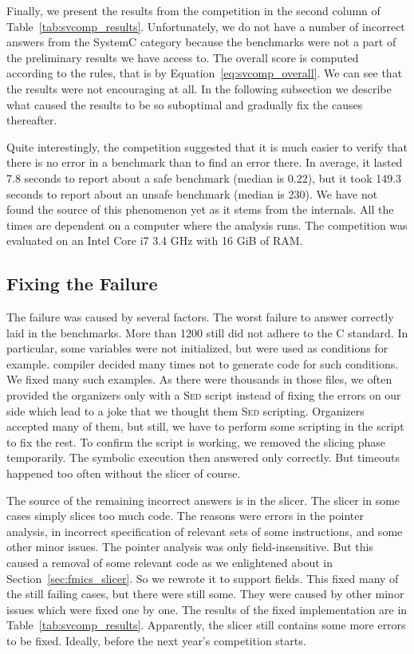 Finally, we present the results from the competition in the second column of
Table~\ref{tab:svcomp_results}. Unfortunately, we do not have a number of
incorrect answers from the SystemC category because the benchmarks were not a
part of the preliminary results we have access to. The overall score is
computed according to the rules, that is by Equation~\ref{eq:svcomp_overall}.
We can see that the \symbio results were not encouraging at all. In the
following subsection we describe what caused the results to be so suboptimal
and gradually fix the causes thereafter.

Quite interestingly, the competition suggested that it is much easier to
verify that there is no error in a benchmark than to find an error there. In
average, it lasted 7.8 seconds to report  about a safe benchmark
(median is 0.22), but it took 149.3 seconds to report  about an
unsafe benchmark (median is 230). We have not found the source of this
phenomenon yet as it stems from the \klee internals. All the times are
dependent on a computer where the analysis runs. The competition was evaluated
on an Intel Core i7 3.4 GHz with 16 GiB of RAM.

\subsection*{Fixing the Failure}
The failure was caused by several factors. The worst failure to answer
correctly laid in the benchmarks. More than 1200 still did not adhere to the C
standard. In particular, some variables were not initialized, but were used as
conditions for example. \clang compiler decided many times not to generate
code for such conditions.  We fixed many such examples. As there were
thousands in those files, we often provided the organizers only with a
\textsc{Sed} script instead of fixing the errors on our side which lead to a
joke that we thought them \textsc{Sed} scripting. Organizers accepted many of
them, but still, we have to perform some scripting in the 
script to fix the rest. To confirm the script is working, we removed the
slicing phase temporarily. The symbolic execution then answered only
correctly. But timeouts happened too often without the slicer of course.

The source of the remaining incorrect answers is in the slicer. The slicer in
some cases simply slices too much code. The reasons were errors in the pointer
analysis, in incorrect specification of relevant sets of some \llvm
instructions, and some other minor issues. The pointer analysis was only
field-insensitive. But this caused a removal of some relevant code as we
enlightened about in Section~\ref{sec:fmics_slicer}. So we rewrote it to
support fields. This fixed many of the still failing cases, but there were
still some. They were caused by other minor issues which were fixed one by
one. The results of the fixed implementation are in
Table~\ref{tab:svcomp_results}. Apparently, the slicer still contains some
more errors to be fixed. Ideally, before the next year's competition starts.

